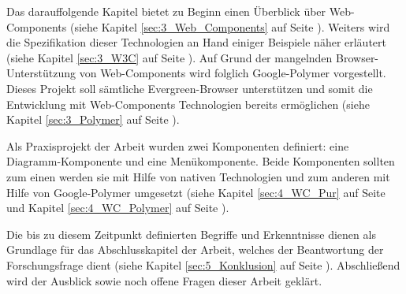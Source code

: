 Das darauffolgende Kapitel bietet zu Beginn einen Überblick über Web-Components (siehe Kapitel \ref{sec:3_Web_Components} auf Seite \pageref{sec:3_Web_Components}). Weiters wird die Spezifikation dieser Technologien an Hand einiger Beispiele näher erläutert (siehe Kapitel \ref{sec:3_W3C} auf Seite \pageref{sec:3_W3C}). Auf Grund der mangelnden Browser-Unterstützung von Web-Components wird folglich Google-Polymer vorgestellt. Dieses Projekt soll sämtliche \glqq Evergreen\grqq -Browser unterstützen und somit die Entwicklung mit Web-Components Technologien bereits ermöglichen (siehe Kapitel \ref{sec:3_Polymer} auf Seite \pageref{sec:3_Polymer}).

Als Praxisprojekt der Arbeit wurden zwei Komponenten definiert: eine Diagramm-Komponente und eine Menükomponente. Beide Komponenten sollten zum einen werden sie mit Hilfe von nativen Technologien und zum anderen mit Hilfe von Google-Polymer umgesetzt (siehe Kapitel \ref{sec:4_WC_Pur} auf Seite \pageref{sec:4_WC_Pur} und Kapitel \ref{sec:4_WC_Polymer} auf Seite \pageref{sec:4_WC_Polymer}).

Die bis zu diesem Zeitpunkt definierten Begriffe und Erkenntnisse dienen als Grundlage für das Abschlusskapitel der Arbeit, welches der Beantwortung der Forschungsfrage dient (siehe Kapitel \ref{sec:5_Konklusion} auf Seite \pageref{sec:5_Konklusion}). Abschließend wird der Ausblick sowie noch offene Fragen dieser Arbeit geklärt.